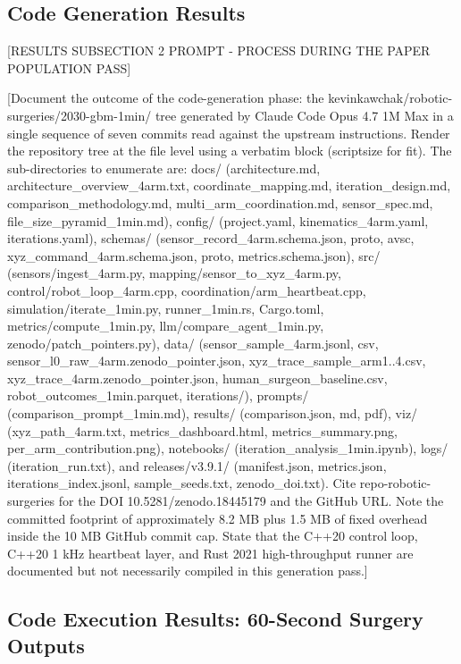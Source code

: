 \subsection{Code Generation Results}
\label{sec:results-code-generation}

[RESULTS SUBSECTION 2 PROMPT - PROCESS DURING THE PAPER POPULATION PASS]

[Document the outcome of the code-generation phase: the
kevinkawchak/robotic-surgeries/2030-gbm-1min/ tree generated by Claude
Code Opus 4.7 1M Max in a single sequence of seven commits read
against the upstream instructions. Render the repository tree at the
file level using a verbatim block (scriptsize for fit). The
sub-directories to enumerate are: docs/ (architecture.md,
architecture_overview_4arm.txt, coordinate_mapping.md,
iteration_design.md, comparison_methodology.md,
multi_arm_coordination.md, sensor_spec.md, file_size_pyramid_1min.md),
config/ (project.yaml, kinematics_4arm.yaml, iterations.yaml),
schemas/ (sensor_record_4arm.{schema.json, proto, avsc},
xyz_command_4arm.{schema.json, proto}, metrics.schema.json), src/
(sensors/ingest_4arm.py, mapping/sensor_to_xyz_4arm.py,
control/robot_loop_4arm.cpp, coordination/arm_heartbeat.cpp,
simulation/{iterate_1min.py, runner_1min.rs, Cargo.toml},
metrics/compute_1min.py, llm/compare_agent_1min.py,
zenodo/patch_pointers.py), data/ (sensor_sample_4arm.{jsonl, csv},
sensor_l0_raw_4arm.zenodo_pointer.json,
xyz_trace_sample_arm{1..4}.csv,
xyz_trace_4arm.zenodo_pointer.json, human_surgeon_baseline.csv,
robot_outcomes_1min.parquet, iterations/), prompts/
(comparison_prompt_1min.md), results/ (comparison.{json, md, pdf}),
viz/ (xyz_path_4arm.txt, metrics_dashboard.html, metrics_summary.png,
per_arm_contribution.png), notebooks/
(iteration_analysis_1min.ipynb), logs/ (iteration_run.txt), and
releases/v3.9.1/ (manifest.json, metrics.json,
iterations_index.jsonl, sample_seeds.txt, zenodo_doi.txt). Cite
repo-robotic-surgeries for the DOI 10.5281/zenodo.18445179 and the
GitHub URL. Note the committed footprint of approximately 8.2 MB
plus 1.5 MB of fixed overhead inside the 10 MB GitHub commit cap.
State that the C++20 control loop, C++20 1 kHz heartbeat layer, and
Rust 2021 high-throughput runner are documented but not necessarily
compiled in this generation pass.]

\subsection{Code Execution Results: 60-Second Surgery Outputs}
\label{sec:results-execution}

